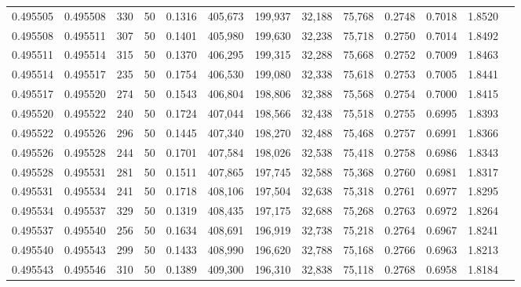 \begin{tabular}{rrrrrrrrrrrrr}
0.495505 & 0.495508 &   330 &  50 &                                     0.1316 & 405,673 & 199,937 &  32,188 &  75,768 & 0.2748 & 0.7018 & 1.8520 \\
0.495508 & 0.495511 &   307 &  50 &                                     0.1401 & 405,980 & 199,630 &  32,238 &  75,718 & 0.2750 & 0.7014 & 1.8492 \\
0.495511 & 0.495514 &   315 &  50 &                                     0.1370 & 406,295 & 199,315 &  32,288 &  75,668 & 0.2752 & 0.7009 & 1.8463 \\
0.495514 & 0.495517 &   235 &  50 &                                     0.1754 & 406,530 & 199,080 &  32,338 &  75,618 & 0.2753 & 0.7005 & 1.8441 \\
0.495517 & 0.495520 &   274 &  50 &                                     0.1543 & 406,804 & 198,806 &  32,388 &  75,568 & 0.2754 & 0.7000 & 1.8415 \\
0.495520 & 0.495522 &   240 &  50 &                                     0.1724 & 407,044 & 198,566 &  32,438 &  75,518 & 0.2755 & 0.6995 & 1.8393 \\
0.495522 & 0.495526 &   296 &  50 &                                     0.1445 & 407,340 & 198,270 &  32,488 &  75,468 & 0.2757 & 0.6991 & 1.8366 \\
0.495526 & 0.495528 &   244 &  50 &                                     0.1701 & 407,584 & 198,026 &  32,538 &  75,418 & 0.2758 & 0.6986 & 1.8343 \\
0.495528 & 0.495531 &   281 &  50 &                                     0.1511 & 407,865 & 197,745 &  32,588 &  75,368 & 0.2760 & 0.6981 & 1.8317 \\
0.495531 & 0.495534 &   241 &  50 &                                     0.1718 & 408,106 & 197,504 &  32,638 &  75,318 & 0.2761 & 0.6977 & 1.8295 \\
0.495534 & 0.495537 &   329 &  50 &                                     0.1319 & 408,435 & 197,175 &  32,688 &  75,268 & 0.2763 & 0.6972 & 1.8264 \\
0.495537 & 0.495540 &   256 &  50 &                                     0.1634 & 408,691 & 196,919 &  32,738 &  75,218 & 0.2764 & 0.6967 & 1.8241 \\
0.495540 & 0.495543 &   299 &  50 &                                     0.1433 & 408,990 & 196,620 &  32,788 &  75,168 & 0.2766 & 0.6963 & 1.8213 \\
0.495543 & 0.495546 &   310 &  50 &                                     0.1389 & 409,300 & 196,310 &  32,838 &  75,118 & 0.2768 & 0.6958 & 1.8184 \\

\end{tabular}
